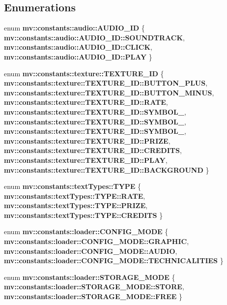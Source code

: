 \subsection*{Enumerations}
\begin{DoxyCompactItemize}
\item 
enum \textbf{ mv\+::constants\+::audio\+::\+A\+U\+D\+I\+O\+\_\+\+ID} \{ \textbf{ mv\+::constants\+::audio\+::\+A\+U\+D\+I\+O\+\_\+\+I\+D\+::\+S\+O\+U\+N\+D\+T\+R\+A\+CK}, 
\textbf{ mv\+::constants\+::audio\+::\+A\+U\+D\+I\+O\+\_\+\+I\+D\+::\+C\+L\+I\+CK}, 
\textbf{ mv\+::constants\+::audio\+::\+A\+U\+D\+I\+O\+\_\+\+I\+D\+::\+P\+L\+AY}
 \}
\item 
enum \textbf{ mv\+::constants\+::texture\+::\+T\+E\+X\+T\+U\+R\+E\+\_\+\+ID} \{ \newline
\textbf{ mv\+::constants\+::texture\+::\+T\+E\+X\+T\+U\+R\+E\+\_\+\+I\+D\+::\+B\+U\+T\+T\+O\+N\+\_\+\+P\+L\+US}, 
\textbf{ mv\+::constants\+::texture\+::\+T\+E\+X\+T\+U\+R\+E\+\_\+\+I\+D\+::\+B\+U\+T\+T\+O\+N\+\_\+\+M\+I\+N\+US}, 
\textbf{ mv\+::constants\+::texture\+::\+T\+E\+X\+T\+U\+R\+E\+\_\+\+I\+D\+::\+R\+A\+TE}, 
\textbf{ mv\+::constants\+::texture\+::\+T\+E\+X\+T\+U\+R\+E\+\_\+\+I\+D\+::\+S\+Y\+M\+B\+O\+L\+\_}, 
\newline
\textbf{ mv\+::constants\+::texture\+::\+T\+E\+X\+T\+U\+R\+E\+\_\+\+I\+D\+::\+S\+Y\+M\+B\+O\+L\+\_}, 
\textbf{ mv\+::constants\+::texture\+::\+T\+E\+X\+T\+U\+R\+E\+\_\+\+I\+D\+::\+S\+Y\+M\+B\+O\+L\+\_}, 
\textbf{ mv\+::constants\+::texture\+::\+T\+E\+X\+T\+U\+R\+E\+\_\+\+I\+D\+::\+P\+R\+I\+ZE}, 
\textbf{ mv\+::constants\+::texture\+::\+T\+E\+X\+T\+U\+R\+E\+\_\+\+I\+D\+::\+C\+R\+E\+D\+I\+TS}, 
\newline
\textbf{ mv\+::constants\+::texture\+::\+T\+E\+X\+T\+U\+R\+E\+\_\+\+I\+D\+::\+P\+L\+AY}, 
\textbf{ mv\+::constants\+::texture\+::\+T\+E\+X\+T\+U\+R\+E\+\_\+\+I\+D\+::\+B\+A\+C\+K\+G\+R\+O\+U\+ND}
 \}
\item 
enum \textbf{ mv\+::constants\+::text\+Types\+::\+T\+Y\+PE} \{ \textbf{ mv\+::constants\+::text\+Types\+::\+T\+Y\+P\+E\+::\+R\+A\+TE}, 
\textbf{ mv\+::constants\+::text\+Types\+::\+T\+Y\+P\+E\+::\+P\+R\+I\+ZE}, 
\textbf{ mv\+::constants\+::text\+Types\+::\+T\+Y\+P\+E\+::\+C\+R\+E\+D\+I\+TS}
 \}
\item 
enum \textbf{ mv\+::constants\+::loader\+::\+C\+O\+N\+F\+I\+G\+\_\+\+M\+O\+DE} \{ \textbf{ mv\+::constants\+::loader\+::\+C\+O\+N\+F\+I\+G\+\_\+\+M\+O\+D\+E\+::\+G\+R\+A\+P\+H\+IC}, 
\textbf{ mv\+::constants\+::loader\+::\+C\+O\+N\+F\+I\+G\+\_\+\+M\+O\+D\+E\+::\+A\+U\+D\+IO}, 
\textbf{ mv\+::constants\+::loader\+::\+C\+O\+N\+F\+I\+G\+\_\+\+M\+O\+D\+E\+::\+T\+E\+C\+H\+N\+I\+C\+A\+L\+I\+T\+I\+ES}
 \}
\item 
enum \textbf{ mv\+::constants\+::loader\+::\+S\+T\+O\+R\+A\+G\+E\+\_\+\+M\+O\+DE} \{ \textbf{ mv\+::constants\+::loader\+::\+S\+T\+O\+R\+A\+G\+E\+\_\+\+M\+O\+D\+E\+::\+S\+T\+O\+RE}, 
\textbf{ mv\+::constants\+::loader\+::\+S\+T\+O\+R\+A\+G\+E\+\_\+\+M\+O\+D\+E\+::\+F\+R\+EE}
 \}
\end{DoxyCompactItemize}
